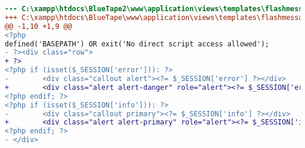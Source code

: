 \begin{lstlisting}[language=diff, caption=Kode untuk Notifikasi Login, label=Entri, basicstyle=\ttfamily, frame=single,
columns=fullflexible, keepspaces=true, breaklines=true]
--- C:\xampp\htdocs\BlueTape2\www\application\views\templates\flashmessage.php	2019-04-29 13:02:52.000000000 +0700
+++ C:\xampp\htdocs\BlueTape\www\application\views\templates\flashmessage.php	2020-03-06 09:56:06.000000000 +0700
@@ -1,10 +1,9 @@
<?php
defined('BASEPATH') OR exit('No direct script access allowed');
- ?><div class="row">
+ ?>
<?php if (isset($_SESSION['error'])): ?>
-        <div class="callout alert"><?= $_SESSION['error'] ?></div>
+        <div class="alert alert-danger" role="alert"><?= $_SESSION['error'] ?></div>
<?php endif; ?>
<?php if (isset($_SESSION['info'])): ?>
-        <div class="callout primary"><?= $_SESSION['info'] ?></div>
+        <div class="alert alert-primary" role="alert"><?= $_SESSION['info'] ?></div>
<?php endif; ?>
- </div>

\end{lstlisting}
